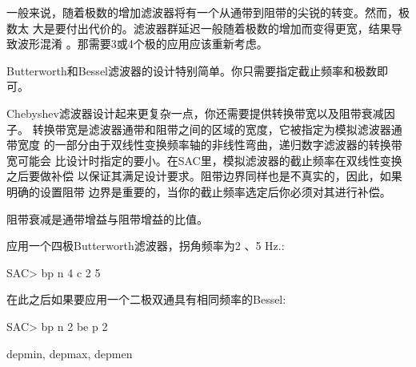 一般来说，随着极数的增加滤波器将有一个从通带到阻带的尖锐的转变。然而，极数太
大是要付出代价的。滤波器群延迟一般随着极数的增加而变得更宽，结果导致波形混淆
。那需要3或4个极的应用应该重新考虑。

Butterworth和Bessel滤波器的设计特别简单。你只需要指定截止频率和极数即可。

Chebyshev滤波器设计起来更复杂一点，你还需要提供转换带宽以及阻带衰减因子。
转换带宽是滤波器通带和阻带之间的区域的宽度，它被指定为模拟滤波器通带宽度
的一部分由于双线性变换频率轴的非线性弯曲，递归数字滤波器的转换带宽可能会
比设计时指定的要小。在SAC里，模拟滤波器的截止频率在双线性变换之后要做补偿
以保证其满足设计要求。阻带边界同样也是不真实的，因此，如果明确的设置阻带
边界是重要的，当你的截止频率选定后你必须对其进行补偿。

阻带衰减是通带增益与阻带增益的比值。

应用一个四极Butterworth滤波器，拐角频率为2 、5 Hz.:
\begin{SACCode}
SAC> bp n 4 c 2 5
\end{SACCode}

在此之后如果要应用一个二极双通具有相同频率的Bessel:
\begin{SACCode}
SAC> bp n 2 be p 2
\end{SACCode}

depmin, depmax, depmen
